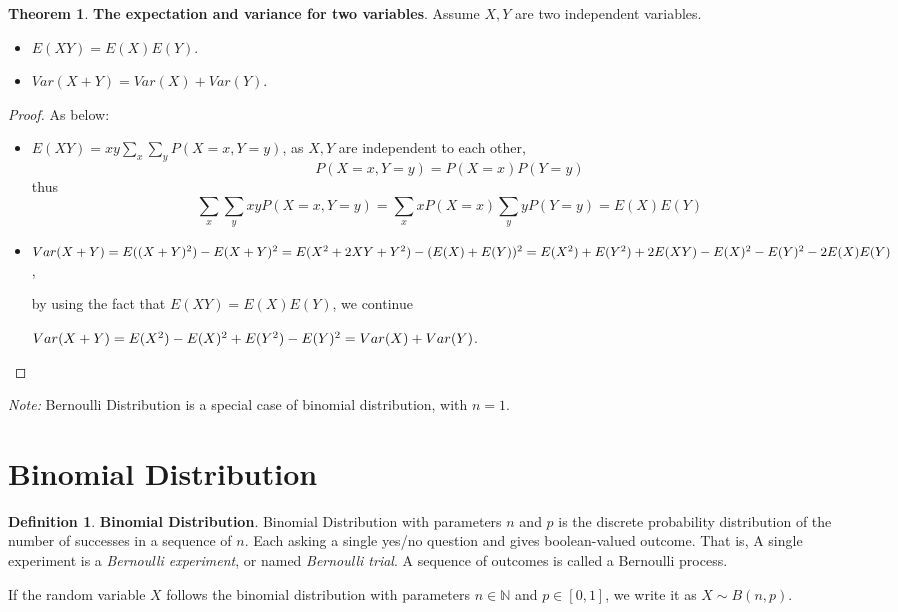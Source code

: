 \documentclass{article}
\theoremstyle{definition}
\newtheorem{defi}{Definition}[section]
\newtheorem{theorem}{Theorem}[section]
\begin{document}
\begin{theorem}
\textbf{The expectation and variance for two variables}. Assume $X,Y$ are two independent variables.
    \begin{itemize}
        \item $E(XY)=E(X)E(Y)$.
        \item $Var(X+Y)=Var(X)+Var(Y)$.
    \end{itemize}
\begin{proof}
As below:
\begin{itemize}
    \item $E(XY)=xy\sum_{x}\sum_{y}P(X=x, Y=y)$, as $X,Y$ are independent to each other, $$P(X=x,Y=y)=P(X=x)P(Y=y)$$ thus $$\sum_{x}\sum_{y}xyP(X=x, Y=y)=\sum_{x}xP(X=x)\sum_{y}yP(Y=y)=E(X)E(Y)$$
    \item $Var(X+Y)\\=E((X+Y)^2)-E(X+Y)^2\\=E(X^2+2XY+Y^2)-(E(X)+E(Y))^2\\=E(X^2)+E(Y^2)+2E(XY)-E(X)^2-E(Y)^2-2E(X)E(Y)$, 
    
    by using the fact that $E(XY)=E(X)E(Y)$, we continue
    
    $Var(X+Y)\\=E(X^2)-E(X)^2+E(Y^2)-E(Y)^2\\=Var(X)+Var(Y)$.
\end{itemize}
\end{proof}
\end{theorem}

\textit{Note:} Bernoulli Distribution is a special case of binomial distribution, with $n=1$.

\section{Binomial Distribution}

\begin{defi}
\textbf{Binomial Distribution}. Binomial Distribution with parameters $n$ and $p$ is the discrete probability distribution of the number of successes in a sequence of $n$. Each asking a single yes/no question and gives boolean-valued outcome. That is, A single experiment is a \textit{Bernoulli experiment}, or named \textit{Bernoulli trial}. A sequence of outcomes is called a Bernoulli process. 

If the random variable $X$ follows the binomial distribution with parameters $n\in \mathbb{N}$ and $p\in[0,1]$, we write it as $X\sim B(n,p)$.
\end{defi}
\end{document}
